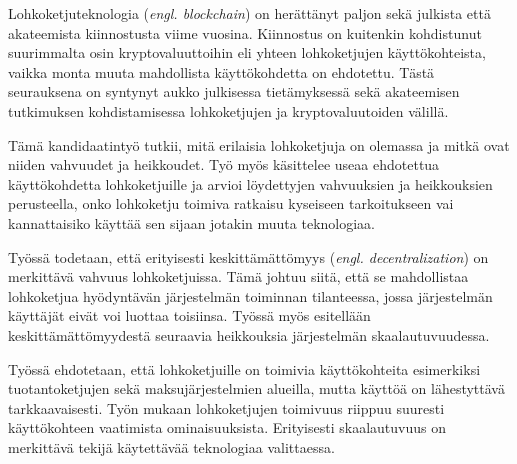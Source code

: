 %
%

\begin{fiabstract}
Lohkoketjuteknologia (\textit{engl. blockchain}) on herättänyt paljon
sekä julkista että akateemista kiinnostusta viime vuosina. Kiinnostus
on kuitenkin kohdistunut suurimmalta osin kryptovaluuttoihin eli
yhteen lohkoketjujen käyttökohteista, vaikka monta muuta mahdollista
käyttökohdetta on ehdotettu. Tästä seurauksena on syntynyt aukko
julkisessa tietämyksessä sekä akateemisen tutkimuksen kohdistamisessa
lohkoketjujen ja kryptovaluutoiden välillä.

Tämä kandidaatintyö tutkii, mitä erilaisia lohkoketjuja on olemassa ja
mitkä ovat niiden vahvuudet ja heikkoudet. Työ myös käsittelee useaa
ehdotettua käyttökohdetta lohkoketjuille ja arvioi löydettyjen
vahvuuksien ja heikkouksien perusteella, onko lohkoketju toimiva
ratkaisu kyseiseen tarkoitukseen vai kannattaisiko käyttää sen sijaan
jotakin muuta teknologiaa.

Työssä todetaan, että erityisesti keskittämättömyys (\textit{engl.
decentralization}) on merkittävä vahvuus lohkoketjuissa. Tämä johtuu
siitä, että se mahdollistaa lohkoketjua hyödyntävän järjestelmän
toiminnan tilanteessa, jossa järjestelmän käyttäjät eivät voi luottaa
toisiinsa. Työssä myös esitellään keskittämättömyydestä seuraavia
heikkouksia järjestelmän skaalautuvuudessa.

Työssä ehdotetaan, että lohkoketjuille on toimivia käyttökohteita
esimerkiksi tuotantoketjujen sekä maksujärjestelmien alueilla, mutta
käyttöä on lähestyttävä tarkkaavaisesti. Työn mukaan lohkoketjujen
toimivuus riippuu suuresti käyttökohteen vaatimista ominaisuuksista.
Erityisesti skaalautuvuus on merkittävä tekijä käytettävää
teknologiaa valittaessa.

%
\end{fiabstract}


